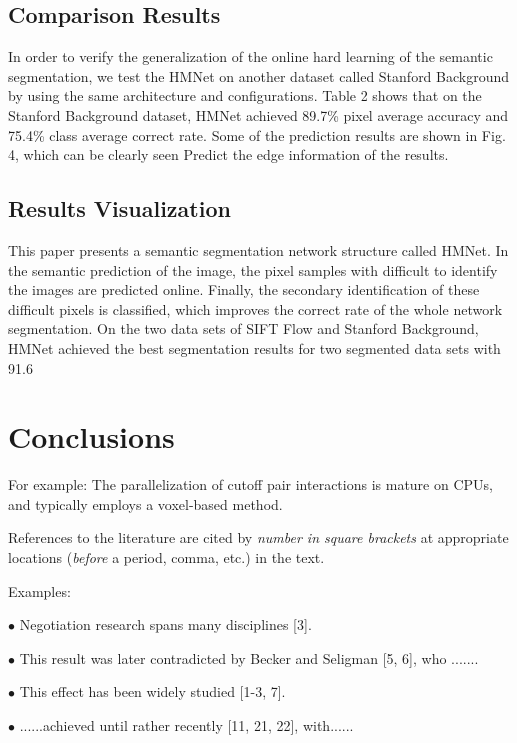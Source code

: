 \documentclass[10.5pt,compsoc]{TsT}
\theoremstyle{mystyle}
\begin{document}
{\subsection{Comparison Results}
\noindent
In order to verify the generalization of the online hard learning of the semantic segmentation, we test the HMNet on another dataset called Stanford Background by using the same architecture and configurations. Table 2 shows that on the Stanford Background dataset, HMNet achieved 89.7\% pixel average accuracy and 75.4\% class average correct rate. Some of the prediction results are shown in Fig. 4, which can be clearly seen Predict the edge information of the results.

\subsection{Results Visualization}
\noindent
This paper presents a semantic segmentation network structure called HMNet. In the semantic prediction of the image, the pixel samples with difficult to identify the images are predicted online. Finally, the secondary identification of these difficult pixels is classified, which improves the correct rate of the whole network segmentation. On the two data sets of SIFT Flow and Stanford Background, HMNet achieved the best segmentation results for two segmented data sets with 91.6%


\section{Conclusions}
\noindent
For example: The parallelization of cutoff pair interactions is mature on CPUs, and typically employs a voxel-based method.


\vskip 6mm
\noindent
References to the literature are cited by \emph{number in square brackets} at appropriate locations (\emph{before} a period, comma, etc.) in the text.

\vskip 6mm
\noindent
Examples:

\setlength{\hangindent}{18pt}
\noindent
  $\bullet$  	Negotiation research spans many disciplines [3].

\setlength{\hangindent}{18pt}
\noindent
  $\bullet$  	This result was later contradicted by Becker and Seligman [5, 6], who .......

\setlength{\hangindent}{18pt}
\noindent
  $\bullet$  	This effect has been widely studied [1-3, 7].

\setlength{\hangindent}{18pt}
\noindent
  $\bullet$  	......achieved until rather recently [11, 21, 22], with......

}
\end{document}
